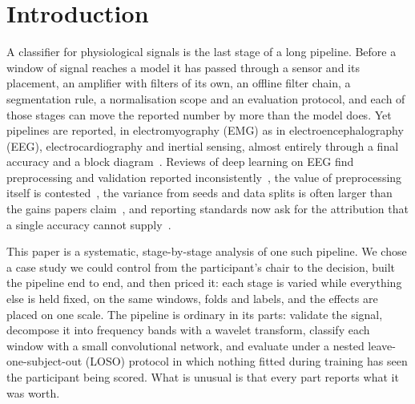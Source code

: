 \documentclass[pdflatex,sn-nature,iicol]{sn-jnl}
\begin{document}

\maketitle
\section{Introduction}

A classifier for physiological signals is the last stage of a long pipeline. Before a window of signal reaches a model it has passed through a sensor and its placement, an amplifier with filters of its own, an offline filter chain, a segmentation rule, a normalisation scope and an evaluation protocol, and each of those stages can move the reported number by more than the model does. Yet pipelines are reported, in electromyography (EMG) as in electroencephalography (EEG), electrocardiography and inertial sensing, almost entirely through a final accuracy and a block diagram~\cite{thymi2021signal,roy2019deep,lipton2019troubling}. Reviews of deep learning on EEG find preprocessing and validation reported inconsistently~\cite{roy2019deep}, the value of preprocessing itself is contested~\cite{delorme2023eeg}, the variance from seeds and data splits is often larger than the gains papers claim~\cite{bouthillier2021accounting}, and reporting standards now ask for the attribution that a single accuracy cannot supply~\cite{kapoor2024reforms,collins2024tripod}.

This paper is a systematic, stage-by-stage analysis of one such pipeline. We chose a case study we could control from the participant's chair to the decision, built the pipeline end to end, and then priced it: each stage is varied while everything else is held fixed, on the same windows, folds and labels, and the effects are placed on one scale. The pipeline is ordinary in its parts: validate the signal, decompose it into frequency bands with a wavelet transform, classify each window with a small convolutional network, and evaluate under a nested leave-one-subject-out (LOSO) protocol in which nothing fitted during training has seen the participant being scored. What is unusual is that every part reports what it was worth.
\end{document}
